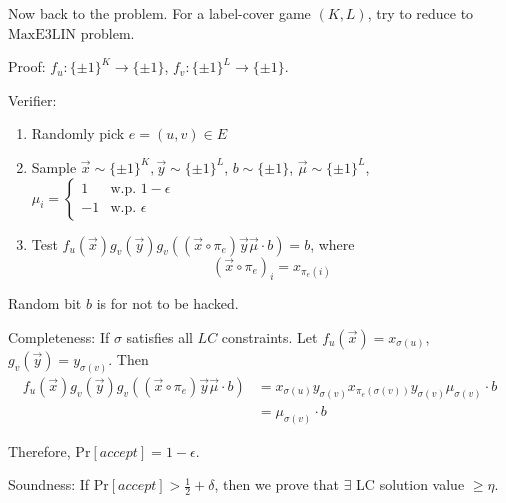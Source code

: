 Now back to the problem. For a label-cover game  $ (K,L) $, try to reduce to  $ \mathrm{MaxE3LIN} $  problem.

Proof:  $ f_u:\{\pm 1\}^K\rightarrow \{\pm 1\} $,  $ f_v:\{\pm 1\}^L\rightarrow\{\pm 1\} $.

Verifier:

\begin{enumerate}
    \item Randomly pick  $ e=(u,v)\in E $
    \item Sample  $ \vec{x}\sim \{\pm 1\}^K,\vec{y}\sim \{\pm 1\}^L $, $ b\sim\{\pm 1\} $,   $ \vec{\mu}\sim \{\pm 1\}^L $,  $ \mu_i=\begin{cases}
        1 & \text{w.p. }1-\epsilon\\
        -1 & \text{w.p. } \epsilon
    \end{cases} $  
    \item Test  $ f_u(\vec{x})g_v(\vec{y})g_v((\vec{x}\circ \pi_e)\vec{y}\vec{\mu}\cdot b)=b $, where 
    \[(\vec{x}\circ \pi_e)_i=x_{\pi_e(i)}\]
\end{enumerate}

Random bit $ b $ is for not to be hacked. 

Completeness: If  $ \sigma $ satisfies all  $ LC $ constraints. Let  $ f_u(\vec{x})=x_{\sigma(u)} $,  $ g_v(\vec{y})=y_{\sigma(v)} $. Then \[ \begin{aligned}
    f_u(\vec{x})g_v(\vec{y})g_v((\vec{x}\circ \pi_e)\vec{y}\vec{\mu}\cdot b)&=x_{\sigma(u)}y_{\sigma(v)}x_{\pi_e(\sigma(v))}y_{\sigma(v)}\mu_{\sigma(v)}\cdot b\\
    &=\mu_{\sigma(v)}\cdot b
\end{aligned} \]

Therefore,  $ \mathrm{Pr}[accept]=1-\epsilon $.

Soundness: If  $ \mathrm{Pr}[accept]>\frac{1}{2}+\delta $,  then  we prove that  $ \exists  $ LC solution value  $  \geq \eta $.

